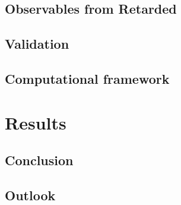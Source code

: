 \section{Observables from Retarded \cgfnc{}}
\section{Validation}
\section{Computational framework}
\chapter{Results}
\section{Conclusion}
\section{Outlook}
\appendix

\clearpage




